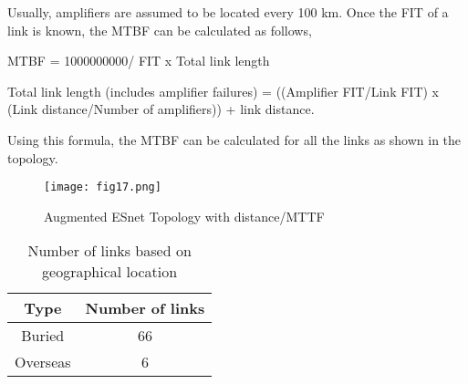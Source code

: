  Usually, amplifiers are assumed to be located every 100 km. Once the FIT of a link is known, the MTBF can be calculated as follows,

MTBF = 1000000000/ FIT x Total link length

Total link length (includes amplifier failures) = ((Amplifier FIT/Link FIT) x (Link distance/Number of amplifiers)) + link distance.

Using this formula, the MTBF can be calculated for all the links as shown in the topology. 

\begin{figure}[hbt!]
\centering
\texttt{[image: fig17.png]}
\caption{Augmented ESnet Topology with distance/MTTF}
\label{fig:esnetTopo}
\end{figure}
\begin{table}[!htbp]
\centering
\caption{Number of links based on geographical location}
 	\begin{tabular}{|c|c|}
	\hline\hline
	\textbf{Type} & \textbf{Number of links}\\
	\hline
	Buried&66\\
	Overseas&6\\
	\hline
	\end{tabular}
\end{table}


